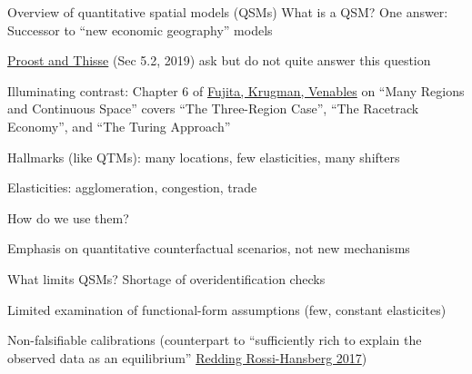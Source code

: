 \documentclass[11pt,notes=hide,aspectratio=169]{beamer}
\begin{document}
\begin{frame}{Overview of quantitative spatial models (QSMs)}
What is a QSM? One answer: Successor to ``new economic geography'' models
\begin{itemize}{\small
\item \href{https://www.aeaweb.org/articles?id=10.1257/jel.20181414}{Proost and Thisse} (Sec 5.2, 2019) ask but do not quite answer this question
\item Illuminating contrast: Chapter 6 of \href{https://direct.mit.edu/books/book/2525/The-Spatial-EconomyCities-Regions-and}{Fujita, Krugman, Venables} on 
``Many Regions and Continuous Space'' covers ``The Three-Region Case'', ``The Racetrack Economy'', and ``The Turing Approach''
\item Hallmarks (like QTMs): many locations, few elasticities, many shifters
\item Elasticities: agglomeration, congestion, trade
}\end{itemize}
How do we use them?
\begin{itemize}{\small
\item Emphasis on quantitative counterfactual scenarios, not new mechanisms
}\end{itemize}
What limits QSMs? Shortage of overidentification checks
\begin{itemize}{\small
\item Limited examination of functional-form assumptions (few, constant elasticites)
\item Non-falsifiable calibrations (counterpart to ``sufficiently rich to explain the observed data as an equilibrium'' \href{https://doi.org/10.1146/annurev-economics-063016-103713}{Redding Rossi-Hansberg 2017})
}\end{itemize}
\end{frame}
\begin{frame}[plain]
\begin{center}
\end{center}
\end{frame}
\end{document}
